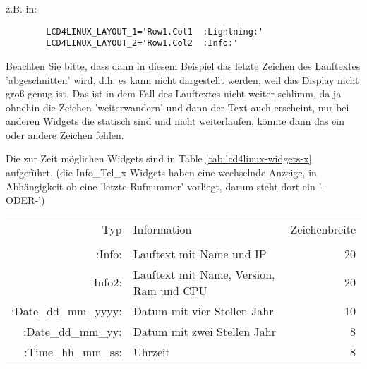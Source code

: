 \begin{description}
  z.B. in:
\begin{example}
\begin{verbatim}
        LCD4LINUX_LAYOUT_1='Row1.Col1  :Lightning:'
        LCD4LINUX_LAYOUT_2='Row1.Col2  :Info:'
\end{verbatim}
\end{example}

  Beachten Sie bitte, dass dann in diesem Beispiel das letzte Zeichen des Lauftextes
  'abgeschnitten' wird, d.h. es kann nicht dargestellt werden, weil das Display
  nicht groß genug ist. Das ist in dem Fall des Lauftextes nicht weiter schlimm,
  da ja ohnehin die Zeichen 'weiterwandern' und dann der Text auch erscheint, nur
  bei anderen Widgets die statisch sind und nicht weiterlaufen, könnte dann das
  ein oder andere Zeichen fehlen.


  Die zur Zeit möglichen Widgets sind in Table \ref{tab:lcd4linux-widgets-x} aufgeführt.
  (die Info\_Tel\_x Widgets haben eine wechselnde Anzeige, in Abhängigkeit ob eine 
  'letzte Rufnummer' vorliegt, darum steht dort ein '-ODER-')

      \begin{small}
       \begin{center}
        \begin{longtable}{rp{7cm}r}

               Typ &     Information   &             Zeichenbreite\\
               \\
                  :Info: &       Lauftext mit Name und IP    &  20 \\
                 :Info2: &       Lauftext mit Name, Version, Ram und CPU   &  20 \\

    :Date\_dd\_mm\_yyyy: &       Datum mit vier Stellen Jahr &  10 \\
      :Date\_dd\_mm\_yy: &       Datum mit zwei Stellen Jahr &   8 \\
      :Time\_hh\_mm\_ss: &       Uhrzeit                     &   8 \\                              


\end{longtable}
\end{center}
\end{small}
\end{description}
